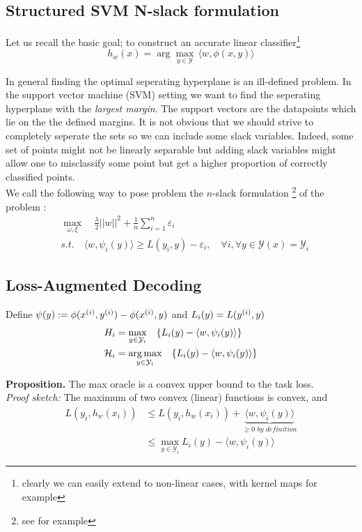 \subsection{Structured SVM N-slack formulation}
Let us recall the basic goal; to construct an accurate linear
classifier\footnote{clearly we can easily extend to non-linear cases, with kernel maps for example}
\begin{equation}
  h_{w}(x)= \arg\max_{y\in \mathcal Y} \, \langle w, \phi(x,y)\rangle
\end{equation}

In general finding the optimal seperating hyperplane is an ill-defined problem.
In the support vector machine (SVM) setting we want to find the seperating
hyperplane with the \emph{largest margin}. The support vectors are the
datapoints which lie on the the defined margins. It is not obvious
that we should strive to completely seperate the sets so we can include some
slack variables. Indeed, some set of points might not be linearly separable but
adding slack variables might allow one to misclassify some point but get 
a higher proportion of correctly classified points.\\

We call the following way to pose problem the $n$-slack formulation
\footnote{see \citet{moguerzaSupportVectorMachines2006} for example} of the problem :
\begin{align}
    &\max_{\omega, \xi}\quad\frac{\lambda}{2}||w||^{2}+ \frac{1}{n}\sum_{i=1}^{n}\varepsilon_{i}\\
    &\textit{s.t.}\quad \langle w, \psi_{i}(y)\rangle \geq L(y_{i},y)-
\varepsilon_{i},\quad\forall i ,\forall y \in\mathcal{Y}(x)=\mathcal{Y}_{i}
\end{align}

\subsection{Loss-Augmented Decoding}
Define $\psi(y) := \phi(x^{(i)},y^{(i)}) - \phi(x^{(i)},y)$ and $L_i(y) = L(y^{(i)}, y)$
\begin{align}
H_i &= \max_{y\in\mathcal{Y}_{i}} \quad \{L_{i}(y)- \langle w, \psi_{i}(y)\rangle\} \\
\mathcal H_i &= \operatorname*{\arg\max}_{y\in\mathcal{Y}_{i}} \quad \{ L_{i}(y)- \langle w, \psi_{i}(y)\rangle \}
\end{align}

\textbf{Proposition.} The max oracle is a convex upper bound to the task loss.\\
\textit{Proof sketch:} The maximum of two convex (linear) functions is convex, and
\begin{align} L(y_{i},h_{w}(x_{i})) &\leq L(y_{i},h_{w}(x_{i})) +
        \underbrace{\langle w, \psi_{i}(y)\rangle}_{\geq 0 \textit{ by definition}} \\
    \quad\quad &\leq \max_{y\in\mathcal{Y}_{i}} L_{i}(y)- \langle w, \psi_{i}(y)\rangle
\end{align}

